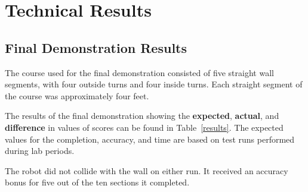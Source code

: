 \section{Technical Results}

\subsection{Final Demonstration Results}

The course used for the final demonstration consisted of five straight
wall segments, with four outside turns and four inside turns. Each
straight segment of the course was approximately four feet. 

The results of the final demonstration showing the \textbf{expected},
\textbf{actual}, and \textbf{difference}  in values of scores can be found in
Table~\ref{results}. The expected values for the completion, accuracy,
and time are based on test runs performed during lab periods. 

\begin{table}[h!]
  \centering \cprotect {}
\end{table} 

The robot did not collide with the wall on either run. It received an
accuracy bonus for five out of the ten sections it completed. 


